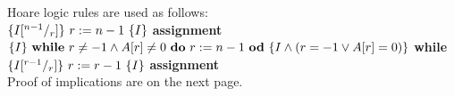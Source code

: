 \documentclass[a4paper]{article}
\begin{document}
\begin{enumerate}
\vspace{6mm}

Hoare logic rules are used as follows:\\
\vspace{3mm}
\( \{I[^{n-1}/_{r}]\}~r := n-1~\{I\} \) \hfill \textbf{assignment}\\
\vspace{2mm}
\( \{I\}~ \text{\normalfont\bfseries while}~ r\neq -1 \wedge A[r]\neq 0 ~\text{\normalfont\bfseries do} ~r := n-1~ \text{\normalfont\bfseries od} ~\{I \wedge (r = -1 \vee A[r] = 0)\} \) \hfill \textbf{while}\\
\vspace{2mm}
\( \{I[^{r-1}/_{r}]\} ~r := r-1~\{I\} \) \hfill \textbf{assignment}\\
\vspace{6mm}
Proof of implications are on the next page.\\

\newpage


\end{enumerate}
\end{document}
